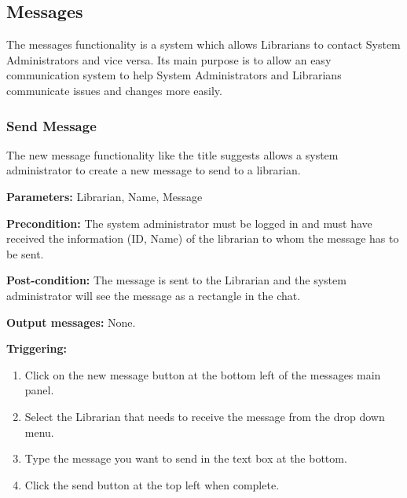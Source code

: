 \subsection{Messages}

The messages functionality is a system which allows Librarians to contact System
Administrators and vice versa. Its main purpose is to allow an easy communication system to help System Administrators and Librarians communicate issues and changes more easily.

\subsubsection{Send Message}

The new message functionality like the title suggests allows a system administrator to create a new message to send to a librarian. 

\begin{description}

\item \textbf{Parameters:} Librarian, Name, Message

\item \textbf{Precondition:} The system administrator must be logged in and must
have received the information (ID, Name) of the librarian to whom the message
has to be sent.

\item \textbf{Post-condition:} The message is sent to the Librarian and the
system administrator will see the message as a rectangle in the chat.

\item \textbf{Output messages:} None.

\item \textbf{Triggering:}
\begin{enumerate}

\item Click on the new message button at the bottom left of the messages main panel. 

\item Select the Librarian that needs to receive the message from the drop down menu.

\item Type the message you want to send in the text box at the bottom. 

\item Click the send button at the top left when complete.  

\end{enumerate}

\end{description}


